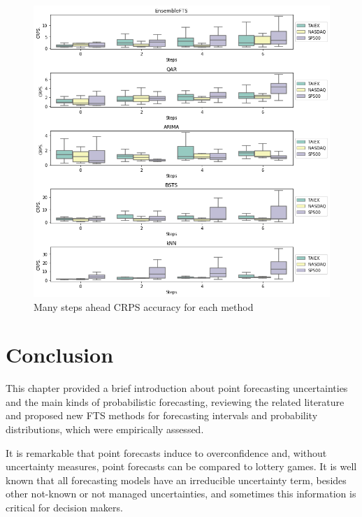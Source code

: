 \begin{figure}[htb]
    \centering
    \includegraphics[width=\textwidth]{figures/probabilistic_many_steps.png}
    \caption{Many steps ahead CRPS accuracy for each method}
    \label{fig:probabilistic_many_steps}
\end{figure}


%
\section{Conclusion}
\label{sec:prob_conclusion}

This chapter provided a brief introduction about point forecasting uncertainties and the main kinds of probabilistic forecasting, reviewing the related literature and proposed new FTS methods for forecasting intervals and probability distributions, which were empirically assessed.

It is remarkable that point forecasts induce to overconfidence and,  without uncertainty measures, point forecasts can be compared to lottery games. It is well known that all forecasting models have an irreducible uncertainty term, besides other not-known or not managed uncertainties, and sometimes this information is critical for decision makers.

